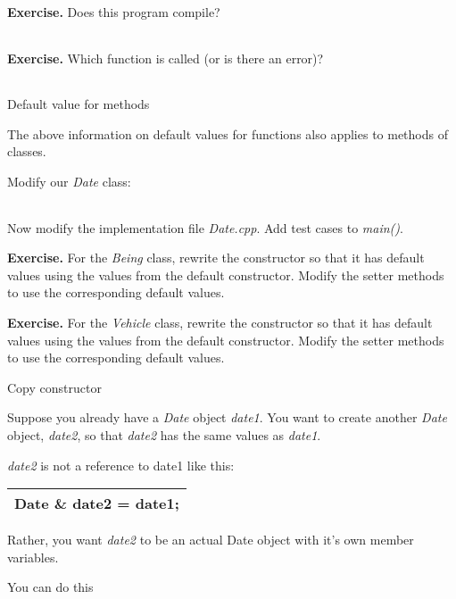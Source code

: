 \documentclass[
]{article}
\begin{document}
\textbf{Exercise.} Does this program compile?

\begin{longtable}[]{@{}@{}}
\toprule
\endhead
\bottomrule
\end{longtable}

\textbf{Exercise.} Which function is called (or is there an error)?

\begin{longtable}[]{@{}@{}}
\toprule
\endhead
\bottomrule
\end{longtable}

Default value for methods

The above information on default values for functions also applies to
methods of classes.

Modify our \emph{Date} class:

\begin{longtable}[]{@{}@{}}
\toprule
\endhead
\bottomrule
\end{longtable}

Now modify the implementation file \emph{Date.cpp}. Add test cases to
\emph{main()}.

\textbf{Exercise.} For the \emph{Being} class, rewrite the constructor
so that it has default values using the values from the default
constructor. Modify the setter methods to use the corresponding default
values.

\textbf{Exercise.} For the \emph{Vehicle} class, rewrite the constructor
so that it has default values using the values from the default
constructor. Modify the setter methods to use the corresponding default
values.

Copy constructor

Suppose you already have a \emph{Date} object \emph{date1}. You want to
create another \emph{Date} object, \emph{date2}, so that \emph{date2}
has the same values as \emph{date1}.

\emph{date2} is not a reference to date1 like this:

\begin{longtable}[]{@{}l@{}}
\toprule
\endhead
Date \& date2 = date1;\tabularnewline
\bottomrule
\end{longtable}

Rather, you want \emph{date2} to be an actual Date object with it's own
member variables.

You can do this

\begin{longtable}[]{@{}@{}}
\toprule
\endhead
\bottomrule
\end{longtable}
\end{document}
